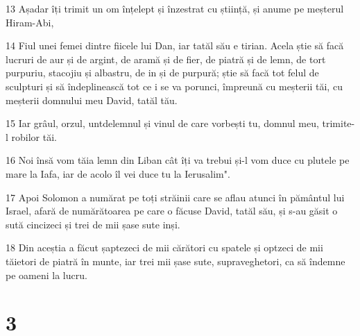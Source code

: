 \par 13 Așadar îți trimit un om înțelept și înzestrat cu știință, și anume pe meșterul Hiram-Abi,
\par 14 Fiul unei femei dintre fiicele lui Dan, iar tatăl său e tirian. Acela știe să facă lucruri de aur și de argint, de aramă și de fier, de piatră și de lemn, de tort purpuriu, stacojiu și albastru, de in și de purpură; știe să facă tot felul de sculpturi și să îndeplinească tot ce i se va porunci, împreună cu meșterii tăi, cu meșterii domnului meu David, tatăl tău.
\par 15 Iar grâul, orzul, untdelemnul și vinul de care vorbești tu, domnul meu, trimite-l robilor tăi.
\par 16 Noi însă vom tăia lemn din Liban cât îți va trebui și-l vom duce cu plutele pe mare la Iafa, iar de acolo îl vei duce tu la Ierusalim".
\par 17 Apoi Solomon a numărat pe toți străinii care se aflau atunci în pământul lui Israel, afară de numărătoarea pe care o făcuse David, tatăl său, și s-au găsit o sută cincizeci și trei de mii șase sute inși.
\par 18 Din aceștia a făcut șaptezeci de mii cărători cu spatele și optzeci de mii tăietori de piatră în munte, iar trei mii șase sute, supraveghetori, ca să îndemne pe oameni la lucru.

\chapter{3}

